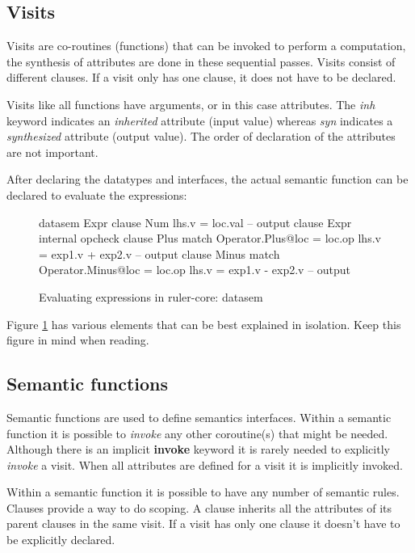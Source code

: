 \subsection{Visits}
Visits are co-routines (functions) that can be invoked to perform a computation, the synthesis of attributes are done in these sequential passes. Visits consist of different clauses. If a visit only has one clause, it does not have to be declared. 

Visits like all functions have arguments, or in this case attributes. The \emph{inh} keyword indicates an \emph{inherited} attribute (input value) whereas \emph{syn} indicates a \emph{synthesized} attribute (output value). The order of declaration of the attributes are not important.

After declaring the datatypes and interfaces, the actual semantic function can be declared to evaluate the expressions:

\begin{figure}[H]
\begin{code}
datasem Expr
   clause Num
     lhs.v = loc.val -- output
   clause Expr
     internal opcheck
       clause Plus
         match Operator.Plus@loc = loc.op
         lhs.v = exp1.v + exp2.v -- output
       clause Minus
         match Operator.Minus@loc = loc.op
         lhs.v = exp1.v - exp2.v -- output
\end{code}
\caption{Evaluating expressions in ruler-core: datasem}
\label{example:tutorial1:datasem}
\end{figure}

Figure \ref{example:tutorial1:datasem} has various elements that can be best explained in isolation. Keep this figure in mind when reading.

\subsection{Semantic functions}
\label{semantics}
Semantic functions are used to define semantics interfaces. Within a semantic function it is possible to \emph{invoke} any other coroutine(s) that might be needed. Although there is an implicit \textbf{invoke} keyword it is rarely needed to explicitly \emph{invoke} a visit. When all attributes are defined for a visit it is implicitly invoked.

Within a semantic function it is possible to have any number of semantic rules. Clauses provide a way to do scoping. A clause inherits all the attributes of its parent clauses in the same visit. If a visit has only one clause it doesn't have to be explicitly declared. 

